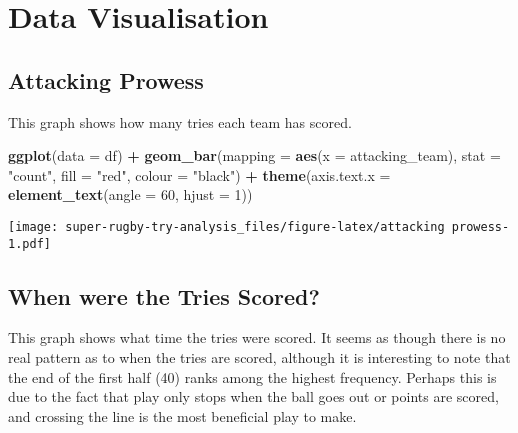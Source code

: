 \documentclass[
]{article}
\newenvironment{Shaded}{\begin{snugshade}}{\end{snugshade}}
\newcommand{\DataTypeTok}[1]{\textcolor[rgb]{0.13,0.29,0.53}{#1}}
\newcommand{\DecValTok}[1]{\textcolor[rgb]{0.00,0.00,0.81}{#1}}
\newcommand{\KeywordTok}[1]{\textcolor[rgb]{0.13,0.29,0.53}{\textbf{#1}}}
\newcommand{\NormalTok}[1]{#1}
\newcommand{\OperatorTok}[1]{\textcolor[rgb]{0.81,0.36,0.00}{\textbf{#1}}}
\newcommand{\StringTok}[1]{\textcolor[rgb]{0.31,0.60,0.02}{#1}}
\begin{document}
\hypertarget{data-visualisation}{%
\section{\texorpdfstring{\textbf{Data
Visualisation}}{Data Visualisation}}\label{data-visualisation}}

\hypertarget{attacking-prowess}{%
\subsection{\texorpdfstring{\textbf{Attacking
Prowess}}{Attacking Prowess}}\label{attacking-prowess}}

This graph shows how many tries each team has scored.

\begin{Shaded}
\begin{Highlighting}[]
\KeywordTok{ggplot}\NormalTok{(}\DataTypeTok{data =}\NormalTok{ df) }\OperatorTok{+}
\StringTok{  }\KeywordTok{geom_bar}\NormalTok{(}\DataTypeTok{mapping =} \KeywordTok{aes}\NormalTok{(}\DataTypeTok{x =}\NormalTok{ attacking_team), }\DataTypeTok{stat =} \StringTok{"count"}\NormalTok{, }\DataTypeTok{fill =} \StringTok{"red"}\NormalTok{, }\DataTypeTok{colour =} \StringTok{"black"}\NormalTok{) }\OperatorTok{+}\StringTok{ }\KeywordTok{theme}\NormalTok{(}\DataTypeTok{axis.text.x =} \KeywordTok{element_text}\NormalTok{(}\DataTypeTok{angle =} \DecValTok{60}\NormalTok{, }\DataTypeTok{hjust =} \DecValTok{1}\NormalTok{))}
\end{Highlighting}
\end{Shaded}

\texttt{[image: super-rugby-try-analysis\_files/figure-latex/attacking prowess-1.pdf]}

\hypertarget{when-were-the-tries-scored}{%
\subsection{\texorpdfstring{\textbf{When were the Tries
Scored?}}{When were the Tries Scored?}}\label{when-were-the-tries-scored}}

This graph shows what time the tries were scored. It seems as though
there is no real pattern as to when the tries are scored, although it is
interesting to note that the end of the first half (40) ranks among the
highest frequency. Perhaps this is due to the fact that play only stops
when the ball goes out or points are scored, and crossing the line is
the most beneficial play to make.
\end{document}
